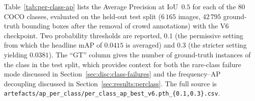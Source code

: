 
Table~\ref{tab:per-class-ap} lists the Average Precision at IoU~$0.5$ for
each of the 80 COCO classes, evaluated on the held-out test split
($6\,165$ images, $42\,795$ ground-truth bounding boxes after the removal of
crowd annotations) with the V6 checkpoint. Two probability thresholds are
reported, $0.1$ (the permissive setting from which the headline mAP of
$0.0415$ is averaged) and $0.3$ (the stricter setting yielding $0.0381$).
The ``GT'' column gives the number of ground-truth instances of the class
in the test split, which provides context for both the rare-class failure
mode discussed in Section~\ref{sec:disc:class-failures} and the
frequency--AP decoupling discussed in Section~\ref{sec:results:perclass}.
The full source is \texttt{artefacts/ap\_per\_class/per\_class\_ap\_best\_v6.pth\_\{0.1,0.3\}.csv}.

